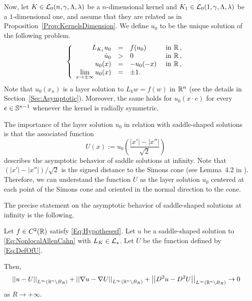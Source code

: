 Now, let $K\in\mathcal{L}_0(n,\gamma,\Lambda, \lambda)$ be a $n$-dimensional kernel and $K_1\in \mathcal{L}_0(1,\gamma,\Lambda, \lambda)$ be a $1$-dimensional one, and assume that they are related as in Proposition~\ref{Prop:KernelsDimension}. We define $u_0$ to be the unique solution of the following problem.
\begin{equation}
\label{Eq:LayerSolution}
\left\{\begin{array}{rcll}
L_{K_1}  u_0 &=& f(u_0) & \textrm{ in }\mathbb{R}\,,\\
\dot{u}_0 &>& 0 & \textrm{ in } \mathbb{R}\,,\\
u_0(x) & = &-u_0(-x)  & \textrm{ in }\mathbb{R}\,,\\
\displaystyle \lim_{x \to \pm \infty} u_0(x) &=& \pm 1. & 
\end{array} \right.
\end{equation}
Note that $u_0(x_n)$ is a layer solution to $L_k w = f(w)$ in $\mathbb{R}^n$ (see the details in Section~\ref{Sec:Asymptotic}). Moreover, the same holds for $u_0(x\cdot e)$ for every $e\in \mathbb{S}^{n-1}$ whenever the kernel is radially symmetric.

The importance of the layer solution $u_0$ in relation with saddle-shaped solutions is that the associated function
\begin{equation}
\label{Eq:DefOfU}
U(x):= u_0 \left( \dfrac{|x'| - |x''|}{\sqrt{2}} \right)\,
\end{equation}
describes the asymptotic behavior of saddle solutions at infinity. Note that $(|x'| - |x''| )/\sqrt{2}$ is the signed distance to the Simons cone (see Lemma~4.2 in \cite{CabreTerraII}). Therefore, we can understand the function $U$ as the layer solution $u_0$ centered at each point of the Simons cone and oriented in the normal direction to the cone.

The precise statement on the asymptotic behavior of saddle-shaped solutions at infinity is the following.

\begin{theorem}
	\label{Th:AsymptoticBehaviorSaddleSolution}
	Let $f\in C^2(\mathbb{R})$ satisfy \eqref{Eq:Hypothesesf}. Let $u$ be a saddle-shaped solution to \eqref{Eq:NonlocalAllenCahn} with $L_K \in \mathcal{L}_\star$. Let $U$ be the function defined by \eqref{Eq:DefOfU}.
	
	Then,
	$$
	\left | \left |{u-U} \right | \right |_{L^\infty(\mathbb{R}^n\setminus B_R)}
	+\left | \left |{\nabla u-\nabla U} \right | \right |_{L^\infty(\mathbb{R}^n\setminus B_R)}
	+\left | \left |{D^2u-D^2U} \right | \right |_{L^\infty(\mathbb{R}^n\setminus B_R)} \to 0
	$$
	as $ R\to +\infty$.
\end{theorem}

